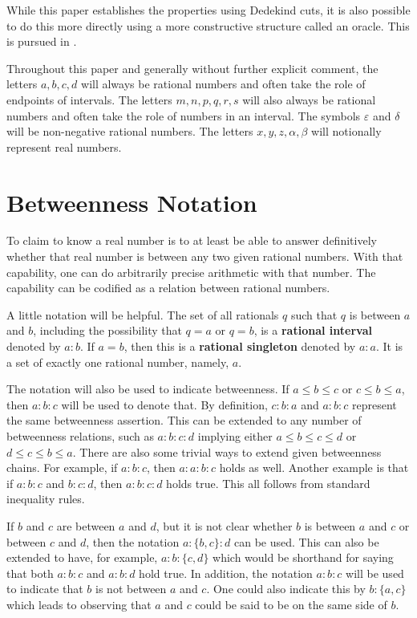 \documentclass[12pt]{article}
\begin{document}
While this paper establishes the properties using Dedekind cuts, it is also possible to do this more directly using a more constructive structure called an oracle. This is pursued in \cite{taylor24oraclerbr}.

Throughout this paper and generally without further explicit comment, the letters $a, b, c, d$ will always be rational numbers and often take the role of endpoints of intervals. The letters $m, n, p, q, r, s$ will also always be rational numbers and often take the role of numbers in an interval. The symbols $\varepsilon$ and $\delta$ will be non-negative rational numbers. The letters $x, y, z, \alpha, \beta$ will notionally represent real numbers.

\section{Betweenness Notation}

To claim to know a real number is to at least be able to answer definitively whether that real number is between any two given rational numbers. With that capability, one can do arbitrarily precise arithmetic with that number. The capability can be codified as a relation between rational numbers. 

A little notation will be helpful. The set of all rationals $q$ such that $q$ is between $a$ and $b$, including the possibility that $q=a$ or $q=b$, is a \textbf{rational interval} denoted by $a:b$. If $a=b$, then this is a \textbf{rational singleton} denoted by $a:a$. It is a set of exactly one rational number, namely, $a$. 

The notation will also be used to indicate betweenness. If $a \leq b \leq c$ or $c \leq b \leq a$, then $a:b:c$ will be used to denote that. By definition, $c:b:a$ and $a:b:c$ represent the same betweenness assertion. This can be extended to any number of betweenness relations, such as $a:b:c:d$ implying either $a \leq b \leq c \leq d$ or $d \leq c \leq b \leq a$. There are also some trivial ways to extend given betweenness chains. For example, if $a:b:c$, then $a:a:b:c$ holds as well. Another example is that if $a:b:c$ and $b:c:d$, then $a:b:c:d$ holds true. This all follows from standard inequality rules. 

If $b$ and $c$ are between $a$ and $d$, but it is not clear whether $b$ is between $a$ and $c$ or between $c$ and $d$, then the notation $a:\{b,c\}:d$ can be used. This can also be extended to have, for example, $a:b:\{c,d\}$ which would be shorthand for saying that both $a:b:c$ and $a:b:d$ hold true. In addition, the notation \sout{$a:b:c$} will be used to indicate that $b$ is not between $a$ and $c$. One could also indicate this by $b:\{a,c\}$ which leads to observing that $a$ and $c$ could be said to be on the same side of $b$. 
\end{document}
